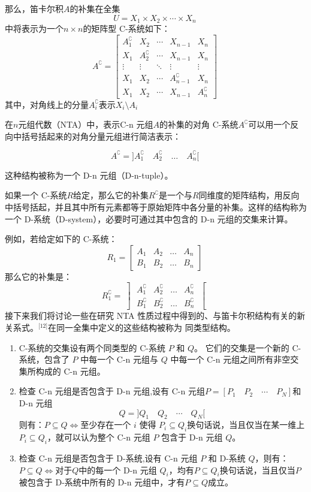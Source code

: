 那么，笛卡尔积\( A \)的补集在全集  
\[
U = X_1 \times X_2 \times \cdots \times X_n~
\]  
中将表示为一个\( n \times n \)的矩阵型 C-系统如下：
\[
A^\complement =
\left[
\begin{array}{ccccc}
A_1^\complement & X_2 & \cdots & X_{n-1} & X_n \\
X_1 & A_2^\complement & \cdots & X_{n-1} & X_n \\
\vdots & \vdots & \ddots & \vdots & \vdots \\
X_1 & X_2 & \cdots & A_{n-1}^\complement & X_n \\
X_1 & X_2 & \cdots & X_{n-1} & A_n^\complement
\end{array}
\right]~
\]
其中，对角线上的分量\( A_i^\complement \)表示\(X_i \setminus A_i\) 

在\(n\)元组代数（NTA）中，表示C-n 元组\( A \)的补集的对角 C-系统\( A^\complement \)可以用一个反向中括号括起来的对角分量元组进行简洁表示：

\[
A^\complement = ]A_1^\complement\quad A_2^\complement\quad \dots\quad A_n^\complement[~
\]

这种结构被称为一个 D-n 元组（D-n-tuple）。

如果一个 C-系统\( R \)给定，那么它的补集\( R^\complement \)是一个与\( R \)同维度的矩阵结构，用反向中括号括起，并且其中所有元素都等于原始矩阵中各分量的补集。这样的结构称为一个 D-系统（D-system），必要时可通过其中包含的 D-n 元组的交集来计算。

例如，若给定如下的 C-系统：
\[
R_1 =
\left[
\begin{array}{cccc}
A_1 & A_2 & \dots & A_n \\
B_1 & B_2 & \dots & B_n
\end{array}
\right]~
\]
那么它的补集是：
\[
R_1^\complement =
\left]
\begin{array}{cccc}
A_1^\complement & A_2^\complement & \dots & A_n^\complement \\
B_1^\complement & B_2^\complement & \dots & B_n^\complement
\end{array}
\right[~
\]
接下来我们将讨论一些在研究 NTA 性质过程中得到的、与笛卡尔积结构有关的新关系式。\(^\text{[12]}\)在同一全集中定义的这些结构被称为 同类型结构。
\begin{enumerate}
\item C-系统的交集设有两个同类型的 C-系统 \( P \) 和 \( Q \)。  
它们的交集是一个新的 C-系统，包含了 \( P \) 中每一个 C-n 元组与 \( Q \) 中每一个 C-n 元组之间所有非空交集所构成的 C-n 元组。
\item 检查 C-n 元组是否包含于 D-n 元组,设有 C-n 元组\(P = [P_1\quad P_2\quad \cdots \quad P_N]\)和 D-n 元组
\[
Q = ]Q_1\quad Q_2\quad \cdots \quad Q_N[~
\]  
则有：\(P \subseteq Q \iff \text{至少存在一个 } i \text{ 使得 } P_i \subseteq Q_i\)换句话说，当且仅当在某一维上 \( P_i \subseteq Q_i \)，就可以认为整个 C-n 元组 \( P \) 包含于 D-n 元组 \( Q \)。
\item 检查 C-n 元组是否包含于 D-系统,设有 C-n 元组 \( P \) 和 D-系统 \( Q \)，则有：\(P \subseteq Q \iff \)对于\(Q\)中的每一个 D-n 元组 \(Q_i\)，均有\(P \subseteq Q_i\)换句话说，当且仅当\( P \)被包含于 D-系统中所有的 D-n 元组中，才有\( P \subseteq Q \)成立。
\end{enumerate}
